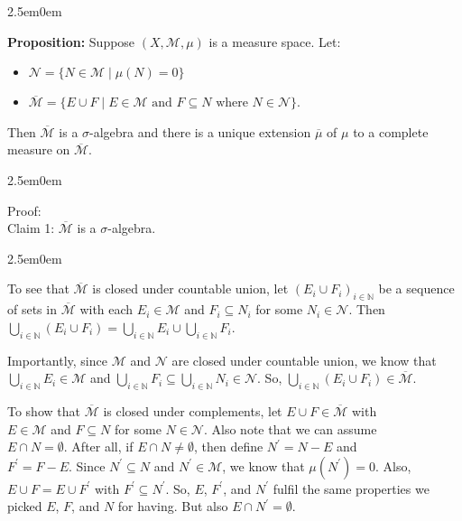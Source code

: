 \documentclass{book}
\newcommand{\hTwo}{%
\color{MidnightBlue}%
   \fontsize{13}{15}\selectfont%
}
\newcommand{\hThree}{%
   \color{PineGreen!85!Orange}
   \fontsize{12}{14}\selectfont%
}
\newcommand{\hFour}{%
   \color{Cyan!80!black}
   \fontsize{12}{14}\selectfont%
}
\newenvironment{myIndent}{%
   \begin{adjustwidth}{2.5em}{0em}%
}{%
   \end{adjustwidth}%
}
\newcommand{\blab}[1]{\textbf{#1}}
\newcommand{\retTwo}{\hfill\bigbreak}
\begin{document}
\begin{myIndent}\hTwo
   \blab{Proposition:} Suppose $(X, \mathcal{M}, \mu)$ is a measure space. Let:
   \begin{itemize}
      \item $\mathcal{N} = \{N \in \mathcal{M} \mid \mu(N) = 0\}$
      \item $\overline{\mathcal{M}} = \{E \cup F \mid E \in \mathcal{M} \text{ and } F \subseteq N \text{ where } N \in \mathcal{N}\}$.\retTwo
   \end{itemize}

   Then $\overline{\mathcal{M}}$ is a $\sigma$-algebra and there is a unique extension $\overline{\mu}$ of $\mu$ to a complete measure on $\overline{\mathcal{M}}$.
   
   \begin{myIndent}\hThree
      Proof:\\
      Claim 1: $\overline{\mathcal{M}}$ is a $\sigma$-algebra.
      \begin{myIndent}\hFour
         To see that $\overline{\mathcal{M}}$ is closed under countable union, let $(E_i \cup F_i)_{i \in \mathbb{N}}$ be a sequence of sets in $\overline{\mathcal{M}}$ with each $E_i \in \mathcal{M}$ and $F_i \subseteq N_i$ for some $N_i \in \mathcal{N}$. Then\\ $\bigcup\limits_{i \in \mathbb{N}}(E_i \cup F_i) = \bigcup\limits_{i \in \mathbb{N}}E_i \cup \bigcup\limits_{i \in \mathbb{N}}F_i$.\retTwo

         Importantly, since $\mathcal{M}$ and $\mathcal{N}$ are closed under countable union, we know that $\bigcup\limits_{i \in \mathbb{N}}E_i \in \mathcal{M}$ and $\bigcup\limits_{i \in \mathbb{N}}F_i \subseteq \bigcup\limits_{i \in \mathbb{N}}N_i \in \mathcal{N}$. So, $\bigcup\limits_{i \in \mathbb{N}}(E_i \cup F_i) \in \overline{\mathcal{M}}$.\retTwo

         To show that $\overline{\mathcal{M}}$ is closed under complements, let $E \cup F \in \overline{\mathcal{M}}$ with\\ $E \in \mathcal{M}$ and $F \subseteq N$ for some $N \in \mathcal{N}$. Also note that we can assume\\ $E \cap N = \emptyset$. After all, if $E \cap N \neq \emptyset$, then define $N^\prime = N - E$ and\\ $F^\prime = F - E$. Since $N^\prime \subseteq N$ and $N^\prime \in \mathcal{M}$, we know that $\mu(N^\prime) = 0$. Also, $E \cup F = E \cup F^\prime$ with $F^\prime \subseteq N^\prime$. So, $E$, $F^\prime$, and $N^\prime$ fulfil the same properties we picked $E$, $F$, and $N$ for having. But also $E \cap N^\prime = \emptyset$.\retTwo


\end{myIndent}
\end{myIndent}
\end{myIndent}
\end{document}
